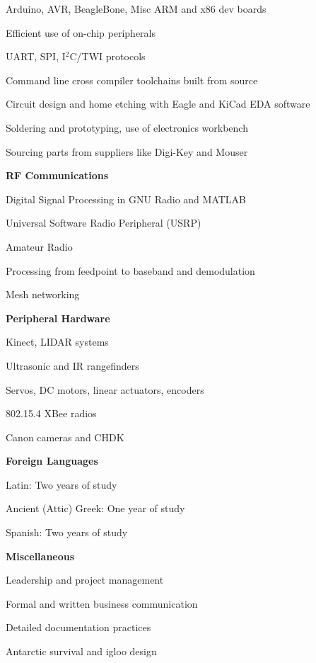 \documentclass[10pt,letterpaper]{article}
\begin{document}
\begin{itemize*}
        \begin{itemize*}
            \item Arduino, AVR, BeagleBone, Misc ARM and x86 dev boards
            \item Efficient use of on-chip peripherals
            \item UART, SPI, I$^2$C/TWI protocols
            \item Command line cross compiler toolchains built from source
            \item Circuit design and home etching with Eagle and KiCad EDA software
            \item Soldering and prototyping, use of electronics workbench
            \item Sourcing parts from suppliers like Digi-Key and Mouser
        \end{itemize*}
    \item \textbf{RF Communications}
        \begin{itemize*}
            \item Digital Signal Processing in GNU Radio and MATLAB
            \item Universal Software Radio Peripheral (USRP)
            \item Amateur Radio
            \item Processing from feedpoint to baseband and demodulation
            \item Mesh networking
        \end{itemize*}
    \item \textbf{Peripheral Hardware}
        \begin{itemize*}
            \item Kinect, LIDAR systems
            \item Ultrasonic and IR rangefinders
            \item Servos, DC motors, linear actuators, encoders
            \item 802.15.4 XBee radios
            \item Canon cameras and CHDK
        \end{itemize*}
    \item \textbf{Foreign Languages}
        \begin{itemize*}
            \item Latin: Two years of study
            \item Ancient (Attic) Greek: One year of study
            \item Spanish: Two years of study
        \end{itemize*}
    \item \textbf{Miscellaneous}
        \begin{itemize*}
            \item Leadership and project management
            \item Formal and written business communication
            \item Detailed documentation practices
            \item Antarctic survival and igloo design
        \end{itemize*}
\end{itemize*}
\end{document}
